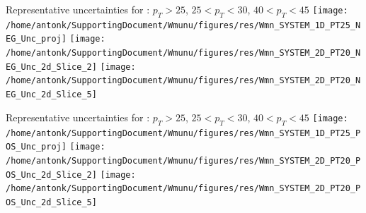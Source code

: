 {\begin{columns}

\end{columns}
}

{

Representative uncertainties for : $p_{T}>25$, $25<p_{T}<30$, $40<p_{T}<45$
\texttt{[image: /home/antonk/SupportingDocument/Wmunu/figures/res/Wmn\_SYSTEM\_1D\_PT25\_NEG\_Unc\_proj]}
\texttt{[image: /home/antonk/SupportingDocument/Wmunu/figures/res/Wmn\_SYSTEM\_2D\_PT20\_NEG\_Unc\_2d\_Slice\_2]}
\texttt{[image: /home/antonk/SupportingDocument/Wmunu/figures/res/Wmn\_SYSTEM\_2D\_PT20\_NEG\_Unc\_2d\_Slice\_5]}

Representative uncertainties for : $p_{T}>25$, $25<p_{T}<30$, $40<p_{T}<45$
\texttt{[image: /home/antonk/SupportingDocument/Wmunu/figures/res/Wmn\_SYSTEM\_1D\_PT25\_POS\_Unc\_proj]}
\texttt{[image: /home/antonk/SupportingDocument/Wmunu/figures/res/Wmn\_SYSTEM\_2D\_PT20\_POS\_Unc\_2d\_Slice\_2]}
\texttt{[image: /home/antonk/SupportingDocument/Wmunu/figures/res/Wmn\_SYSTEM\_2D\_PT20\_POS\_Unc\_2d\_Slice\_5]}

}

